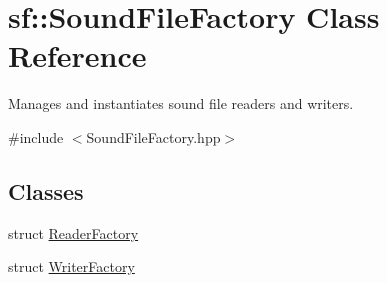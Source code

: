 \hypertarget{classsf_1_1_sound_file_factory}{}\section{sf\+:\+:Sound\+File\+Factory Class Reference}
\label{classsf_1_1_sound_file_factory}


Manages and instantiates sound file readers and writers.  




{\ttfamily \#include $<$Sound\+File\+Factory.\+hpp$>$}

\subsection*{Classes}
\begin{DoxyCompactItemize}
\item 
struct \mbox{\hyperlink{structsf_1_1_sound_file_factory_1_1_reader_factory}{Reader\+Factory}}
\item 
struct \mbox{\hyperlink{structsf_1_1_sound_file_factory_1_1_writer_factory}{Writer\+Factory}}
\end{DoxyCompactItemize}
